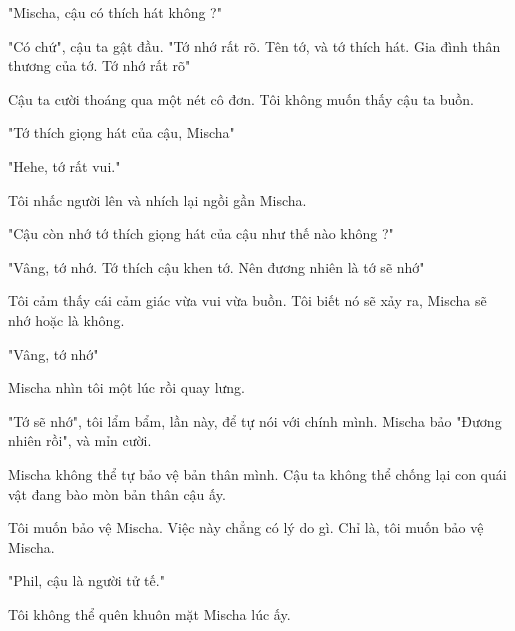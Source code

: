 
"Mischa, cậu có thích hát không ?"

"Có chứ", cậu ta gật đầu. "Tớ nhớ rất rõ. Tên tớ, và tớ thích hát. Gia đình thân thương của tớ. Tớ nhớ rất rõ"

Cậu ta cười thoáng qua một nét cô đơn. Tôi không muốn thấy cậu ta buồn.

"Tớ thích giọng hát của cậu, Mischa"

"Hehe, tớ rất vui."

Tôi nhấc người lên và nhích lại ngồi gần Mischa.

"Cậu còn nhớ tớ thích giọng hát của cậu như thế nào không ?"

"Vâng, tớ nhớ. Tớ thích cậu khen tớ. Nên đương nhiên là tớ sẽ nhớ"

Tôi cảm thấy cái cảm giác vừa vui vừa buồn. Tôi biết nó sẽ xảy ra, Mischa sẽ nhớ hoặc là không.

"Vâng, tớ nhớ"

Mischa nhìn tôi một lúc rồi quay lưng.

"Tớ sẽ nhớ", tôi lẩm bẩm, lần này, để tự nói với chính mình. Mischa bảo "Đương nhiên rồi", và mỉn cười.

Mischa không thể tự bảo vệ bản thân mình. Cậu ta không thể chống lại con quái vật đang bào mòn bản thân cậu ấy.

Tôi muốn bảo vệ Mischa. Việc này chẳng có lý do gì. Chỉ là, tôi muốn bảo vệ Mischa.

"Phil, cậu là người tử tế."

Tôi không thể quên khuôn mặt Mischa lúc ấy.\\

